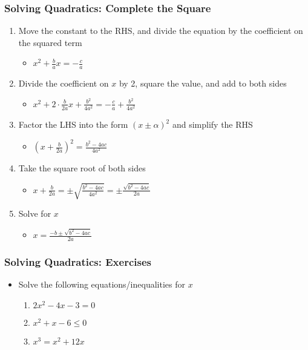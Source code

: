 \documentclass[pdflatex, 12pt]{beamer}
\begin{document}
\begin{frame}
\frametitle{Solving Quadratics: Complete the Square}
\begin{enumerate}
\item Move the constant to the RHS, and divide the equation by the coefficient on the squared term
 \begin{itemize}
 \item $x^2 + \frac{b}{a}x = -\frac{c}{a}$
 \end{itemize}
\vspace{0.2cm}
\item Divide the coefficient on $x$ by 2, square the value, and add to both sides
 \begin{itemize}
 \item $x^2 + 2 \cdot \frac{b}{2a}x + \frac{b^2}{4a^2} = -\frac{c}{a} + \frac{b^2}{4a^2}$
 \end{itemize}
\vspace{0.2cm}
\item Factor the LHS into the form $(x \pm \alpha)^2$ and simplify the RHS
 \begin{itemize}
 \item $(x + \frac{b}{2a})^2 = \frac{b^2 - 4ac}{4a^2}$
 \end{itemize}
\vspace{0.2cm}
\item Take the square root of both sides
 \begin{itemize}
 \item $x + \frac{b}{2a} = \pm \sqrt{\frac{b^2 - 4ac}{4a^2}} = \pm \frac{\sqrt{b^2 - 4ac}}{2a}$
 \end{itemize}
\vspace{0.2cm}
\item Solve for $x$
 \begin{itemize}
 \item $x = \frac{-b \pm \sqrt{b^2 - 4ac}}{2a}$
 \end{itemize}
\end{enumerate}
\end{frame}

\begin{frame}
\frametitle{Solving Quadratics: Exercises}
\begin{itemize}
\item Solve the following equations/inequalities for $x$
 \begin{enumerate}
 \item $2x^2 - 4x - 3 = 0$
 \item $x^2 + x - 6 \leq 0$
 \item $x^3 = x^2 + 12x$
 \end{enumerate}
\end{itemize}
\end{frame}
\end{document}
